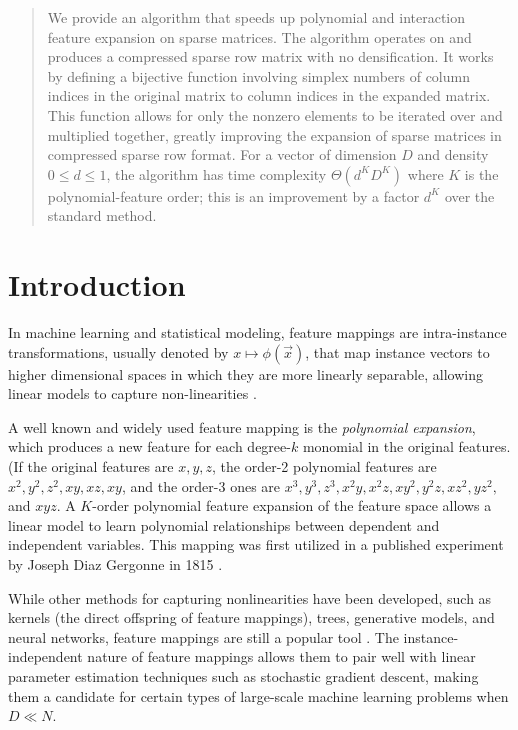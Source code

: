 \documentclass{article}
\begin{document}
\begin{abstract}
We provide an algorithm that speeds up polynomial and interaction feature expansion on sparse matrices.
The algorithm operates on and produces a compressed sparse row matrix with no densification.
It works by defining a bijective function involving simplex numbers of column indices in the original matrix to column indices in the expanded matrix.
This function allows for only the nonzero elements to be iterated over and multiplied together, greatly improving the expansion of sparse matrices in compressed sparse row format.
For a vector of dimension $D$ and density $0 \le d \le 1$, the algorithm has time complexity $\Theta(d^KD^K)$ where $K$ is the polynomial-feature order; this  is an improvement by a factor $d^K$ over the standard method.
\end{abstract}

\section{Introduction}

In machine learning and statistical modeling, feature mappings are intra-instance transformations, usually denoted by $x \mapsto \phi(\vec{x})$, that map instance vectors to higher dimensional spaces in which they are more linearly separable, allowing linear models to capture non-linearities \cite{yuan2012recent}.

A well known and widely used feature mapping is the \emph{polynomial expansion}, which produces a new feature for each degree-$k$ monomial in the original features. (If the original features are $x,y,z$, the order-2 polynomial features are $x^2, y^2, z^2, xy, xz, xy$, and the order-3 ones are $x^3, y^3, z^3, x^2y, x^2z, xy^2, y^2 z, xz^2, yz^2,$ and $xyz$.
A $K$-order polynomial feature expansion of the feature space allows a linear model to learn polynomial relationships between dependent and independent variables.
This mapping was first utilized in a published experiment by Joseph Diaz Gergonne in 1815 \cite{gergonne1974application, smith1918standard}.

While other methods for capturing nonlinearities have been developed, such as kernels (the direct offspring of feature mappings), trees, generative models, and neural networks, feature mappings are still a popular tool \cite{barker200114, chang2010training, shaw2006intellectual}.
The instance-independent nature of feature mappings allows them to pair well with linear parameter estimation techniques such as stochastic gradient descent, making them a candidate for certain types of large-scale machine learning problems when $D \ll N$.
\end{document}
